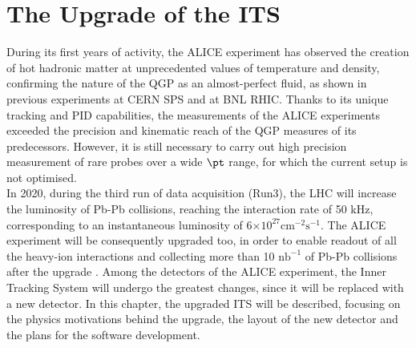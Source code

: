 \chapter{The Upgrade of the ITS}
During its first years of activity, the ALICE experiment has observed the creation of hot hadronic matter at unprecedented values of temperature and density, confirming the nature of the QGP as an almost-perfect fluid, as shown in previous experiments at CERN SPS and at BNL RHIC. Thanks to its unique tracking and PID capabilities, the measurements of the ALICE experiments exceeded the precision and kinematic reach of the QGP measures of its predecessors. However, it is still necessary to carry out high precision measurement of rare probes over a wide $\pt$ range, for which the current setup is not optimised.\\
In 2020, during the third run of data acquisition (Run3), the LHC will increase the luminosity of Pb-Pb collisions, reaching the interaction rate of 50 kHz, corresponding to an instantaneous luminosity of 6$\mathrm{\times 10^{27} cm^{-2}s^{-1}}$. The ALICE experiment will be consequently upgraded too, in order to enable readout of all the heavy-ion interactions and collecting more than 10 $\mathrm{nb^{-1}}$ of Pb-Pb collisions after the upgrade \cite{uptdr}. Among the detectors of the ALICE experiment, the Inner Tracking System will undergo the greatest changes, since it will be replaced with a new detector. In this chapter, the upgraded ITS will be described, focusing on the physics motivations behind the upgrade, the layout of the new detector and the plans for the software development.
